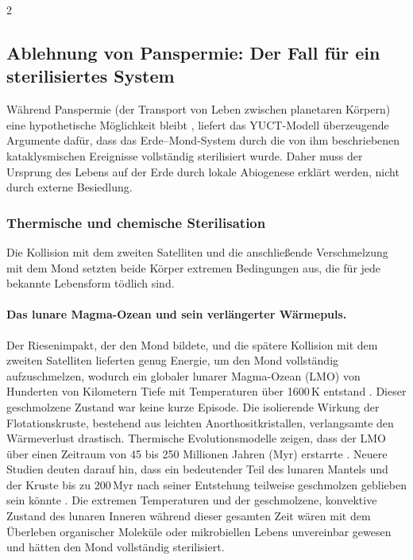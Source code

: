 \documentclass[11pt,a4paper]{article}
\begin{document}
	\begin{multicols}{2}
		
		\subsection{Ablehnung von Panspermie: Der Fall für ein sterilisiertes System}
		
		Während Panspermie (der Transport von Leben zwischen planetaren Körpern) eine hypothetische Möglichkeit bleibt \cite{PanspermiaReview}, liefert das YUCT-Modell überzeugende Argumente dafür, dass das Erde–Mond-System durch die von ihm beschriebenen kataklysmischen Ereignisse vollständig sterilisiert wurde. Daher muss der Ursprung des Lebens auf der Erde durch lokale Abiogenese erklärt werden, nicht durch externe Besiedlung.
		
		\subsubsection{Thermische und chemische Sterilisation}
		
		Die Kollision mit dem zweiten Satelliten und die anschließende Verschmelzung mit dem Mond setzten beide Körper extremen Bedingungen aus, die für jede bekannte Lebensform tödlich sind.
		
		\paragraph{Das lunare Magma-Ozean und sein verlängerter Wärmepuls.}
		Der Riesenimpakt, der den Mond bildete, und die spätere Kollision mit dem zweiten Satelliten lieferten genug Energie, um den Mond vollständig aufzuschmelzen, wodurch ein globaler lunarer Magma-Ozean (LMO) von Hunderten von Kilometern Tiefe mit Temperaturen über 1600 K entstand \cite{Sahijpal2020}. Dieser geschmolzene Zustand war keine kurze Episode. Die isolierende Wirkung der Flotationskruste, bestehend aus leichten Anorthositkristallen, verlangsamte den Wärmeverlust drastisch. Thermische Evolutionsmodelle zeigen, dass der LMO über einen Zeitraum von 45 bis 250 Millionen Jahren (Myr) erstarrte \cite{Colin2024, Maurice2018}. Neuere Studien deuten darauf hin, dass ein bedeutender Teil des lunaren Mantels und der Kruste bis zu 200 Myr nach seiner Entstehung teilweise geschmolzen geblieben sein könnte \cite{Maurice2020}. Die extremen Temperaturen und der geschmolzene, konvektive Zustand des lunaren Inneren während dieser gesamten Zeit wären mit dem Überleben organischer Moleküle oder mikrobiellen Lebens unvereinbar gewesen und hätten den Mond vollständig sterilisiert.
		

\end{multicols}
\end{document}
